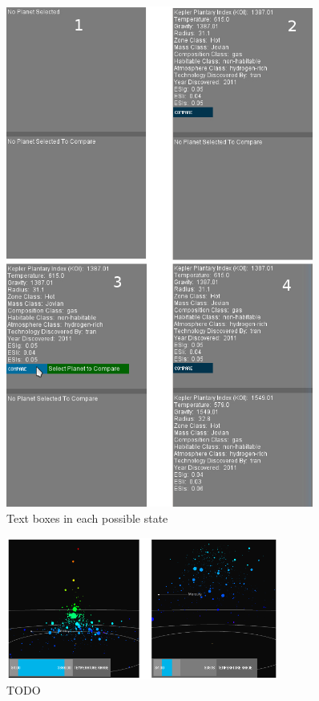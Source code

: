 \begin{figure}[H]
  \centering
      \includegraphics[width=0.9\textwidth]{images/textBoxes.jpg}
  \caption{Text boxes in each possible state}
  \label{fig:textBoxes}
\end{figure}

\begin{figure}[H]
  \centering
      \includegraphics[width=0.8\textwidth]{images/zoomFilter.png}
  \caption{TODO~}  
    \label{fig:zoomFilter}
\end{figure}

